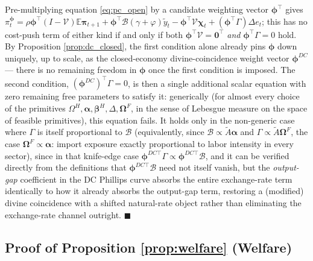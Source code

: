 \documentclass[12pt]{article}
\begin{document}
Pre-multiplying equation \eqref{eq:pc_open} by a candidate weighting vector $\bm\phi^\top$ gives
$\pi_t^{\bm\phi} = \rho\bm\phi^\top(I-\mathcal V)\mathbb E\bm\pi_{t+1} + \bm\phi^\top\mathcal
B(\gamma+\varphi)\tilde y_t - \bm\phi^\top\mathcal V\bm\chi_t + (\bm\phi^\top\Gamma)\Delta e_t$; this
has no cost-push term of either kind if and only if both $\bm\phi^\top\mathcal V=\mathbf 0^\top$
\emph{and} $\bm\phi^\top\Gamma=0$ hold. By Proposition \ref{prop:dc_closed}, the first condition alone
already pins $\bm\phi$ down uniquely, up to scale, as the closed-economy divine-coincidence weight
vector $\bm\phi^{DC}$ --- there is no remaining freedom in $\bm\phi$ once the first condition is
imposed. The second condition, $(\bm\phi^{DC})^\top\Gamma=0$, is then a single additional scalar
equation with zero remaining free parameters to satisfy it: generically (for almost every choice of
the primitives $\Omega^H,\bm\alpha,\bm\beta^H,\Delta,\bm\Omega^F$, in the sense of Lebesgue measure on
the space of feasible primitives), this equation fails. It holds only in the non-generic case where
$\Gamma$ is itself proportional to $\mathcal B$ (equivalently, since $\mathcal B\propto\tilde
A\bm\alpha$ and $\Gamma\propto\tilde A\bm\Omega^F$, the case $\bm\Omega^F\propto\bm\alpha$: import
exposure exactly proportional to labor intensity in every sector), since in that knife-edge case
$\bm\phi^{DC\top}\Gamma\propto\bm\phi^{DC\top}\mathcal B$, and it can be verified directly from the
definitions that $\bm\phi^{DC\top}\mathcal B$ need not itself vanish, but the \emph{output-gap}
coefficient in the DC Phillips curve absorbs the entire exchange-rate term identically to how it
already absorbs the output-gap term, restoring a (modified) divine coincidence with a shifted
natural-rate object rather than eliminating the exchange-rate channel outright. $\blacksquare$

\subsection{Proof of Proposition \ref{prop:welfare} (Welfare)}
\end{document}

